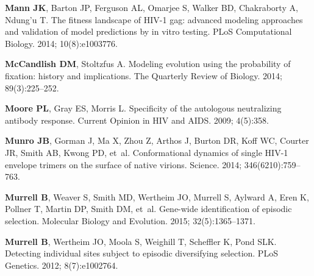 \documentclass[9pt]{elife}
\begin{document}
\begin{thebibliography}{114}
\textbf{\color{eLifeMediumGrey} Mann JK}, Barton JP, Ferguson AL, Omarjee S,
  Walker BD, Chakraborty A, Ndung'u T.
\newblock The fitness landscape of {HIV-1} gag: advanced modeling approaches
  and validation of model predictions by in vitro testing.
\newblock PLoS Computational Biology.  2014; 10(8):e1003776.

\textbf{\color{eLifeMediumGrey} McCandlish DM}, Stoltzfus A.
\newblock Modeling evolution using the probability of fixation: history and
  implications.
\newblock The Quarterly Review of Biology.  2014; 89(3):225--252.

\textbf{\color{eLifeMediumGrey} Moore PL}, Gray ES, Morris L.
\newblock Specificity of the autologous neutralizing antibody response.
\newblock Current Opinion in HIV and AIDS.  2009; 4(5):358.

\textbf{\color{eLifeMediumGrey} Munro JB}, Gorman J, Ma X, Zhou Z, Arthos J,
  Burton DR, Koff WC, Courter JR, Smith AB, Kwong PD, et~al.
\newblock Conformational dynamics of single HIV-1 envelope trimers on the
  surface of native virions.
\newblock Science.  2014; 346(6210):759--763.

\textbf{\color{eLifeMediumGrey} Murrell B}, Weaver S, Smith MD, Wertheim JO,
  Murrell S, Aylward A, Eren K, Pollner T, Martin DP, Smith DM, et~al.
\newblock Gene-wide identification of episodic selection.
\newblock Molecular Biology and Evolution.  2015; 32(5):1365--1371.

\textbf{\color{eLifeMediumGrey} Murrell B}, Wertheim JO, Moola S, Weighill T,
  Scheffler K, Pond SLK.
\newblock Detecting individual sites subject to episodic diversifying
  selection.
\newblock PLoS Genetics.  2012; 8(7):e1002764.


\end{thebibliography}
\end{document}
